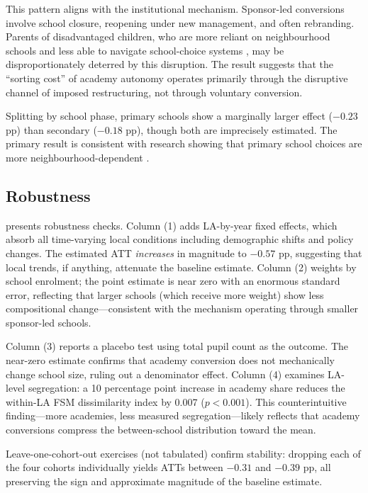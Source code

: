 \documentclass[12pt]{article}
\begin{document}
This pattern aligns with the institutional mechanism. Sponsor-led conversions involve school closure, reopening under new management, and often rebranding. Parents of disadvantaged children, who are more reliant on neighbourhood schools and less able to navigate school-choice systems \citep{burgess2015}, may be disproportionately deterred by this disruption. The result suggests that the ``sorting cost'' of academy autonomy operates primarily through the disruptive channel of imposed restructuring, not through voluntary conversion.

Splitting by school phase, primary schools show a marginally larger effect ($-0.23$ pp) than secondary ($-0.18$ pp), though both are imprecisely estimated. The primary result is consistent with research showing that primary school choices are more neighbourhood-dependent \citep{burgess2009}.

\subsection{Robustness}



 presents robustness checks. Column (1) adds LA-by-year fixed effects, which absorb all time-varying local conditions including demographic shifts and policy changes. The estimated ATT \textit{increases} in magnitude to $-0.57$ pp, suggesting that local trends, if anything, attenuate the baseline estimate. Column (2) weights by school enrolment; the point estimate is near zero with an enormous standard error, reflecting that larger schools (which receive more weight) show less compositional change---consistent with the mechanism operating through smaller sponsor-led schools.

Column (3) reports a placebo test using total pupil count as the outcome. The near-zero estimate confirms that academy conversion does not mechanically change school size, ruling out a denominator effect. Column (4) examines LA-level segregation: a 10 percentage point increase in academy share reduces the within-LA FSM dissimilarity index by 0.007 ($p < 0.001$). This counterintuitive finding---more academies, less measured segregation---likely reflects that academy conversions compress the between-school distribution toward the mean.

Leave-one-cohort-out exercises (not tabulated) confirm stability: dropping each of the four cohorts individually yields ATTs between $-0.31$ and $-0.39$ pp, all preserving the sign and approximate magnitude of the baseline estimate.
\end{document}
